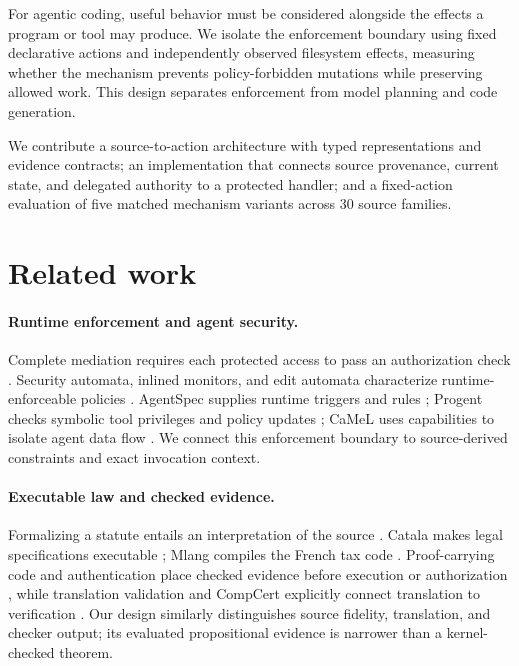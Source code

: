 \documentclass{article}
\begin{document}
For agentic coding, useful behavior must be considered alongside the effects a program or tool may produce. We isolate the enforcement boundary using fixed declarative actions and independently observed filesystem effects, measuring whether the mechanism prevents policy-forbidden mutations while preserving allowed work. This design separates enforcement from model planning and code generation.

We contribute a source-to-action architecture with typed representations and evidence contracts; an implementation that connects source provenance, current state, and delegated authority to a protected handler; and a fixed-action evaluation of five matched mechanism variants across 30 source families.


\section{Related work}
\label{sec:related}

\paragraph{Runtime enforcement and agent security.}
Complete mediation requires each protected access to pass an authorization check \citep{saltzer1975protection}. Security automata, inlined monitors, and edit automata characterize runtime-enforceable policies \citep{schneider2000enforceable,erlingsson2000irm,ligatti2005edit,hamlen2006enforcement}. AgentSpec supplies runtime triggers and rules \citep{wang2025agentspec}; Progent checks symbolic tool privileges and policy updates \citep{shi2025progent}; CaMeL uses capabilities to isolate agent data flow \citep{debenedetti2025camel}. We connect this enforcement boundary to source-derived constraints and exact invocation context.

\paragraph{Executable law and checked evidence.}
Formalizing a statute entails an interpretation of the source \citep{sergot1986bna,prakken2015lawlogic,benzmueller2020logikey}. Catala makes legal specifications executable \citep{catala}; Mlang compiles the French tax code \citep{merigoux2021tax}. Proof-carrying code and authentication place checked evidence before execution or authorization \citep{necula1997pcc,appel1999pca}, while translation validation and CompCert explicitly connect translation to verification \citep{pnueli1998translation,leroy2009compcert}. Our design similarly distinguishes source fidelity, translation, and checker output; its evaluated propositional evidence is narrower than a kernel-checked theorem.
\end{document}
